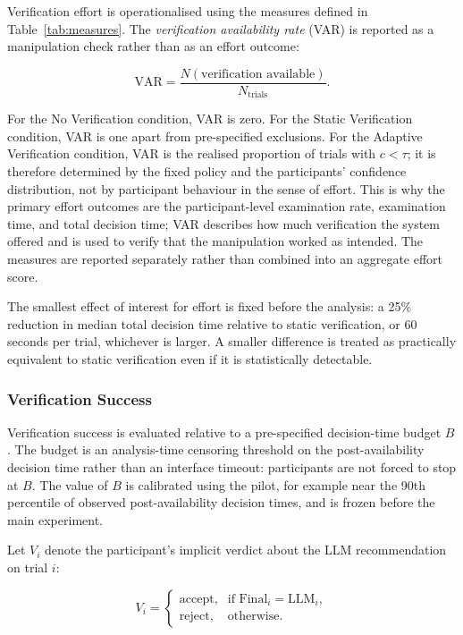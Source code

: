 \documentclass[oneside,final,14pt,a4paper]{extreport}
\begin{document}
Verification effort is operationalised using the measures defined in
Table~\ref{tab:measures}. The \emph{verification availability rate} (VAR) is
reported as a manipulation check rather than as an effort outcome:

$$
\text{VAR}
=
\frac{
N(\text{verification available})
}{
N_{\text{trials}}
}.
$$

For the No Verification condition, VAR is zero. For the Static Verification
condition, VAR is one apart from pre-specified exclusions. For the Adaptive
Verification condition, VAR is the realised proportion of trials with
$c<\tau$; it is therefore determined by the fixed policy and the participants'
confidence distribution, not by participant behaviour in the sense of effort.
This is why the primary effort outcomes are the participant-level examination
rate, examination time, and total decision time; VAR describes how much
verification the system offered and is used to verify that the manipulation
worked as intended. The measures are reported separately rather than combined
into an aggregate effort score.

The smallest effect of interest for effort is fixed before the analysis: a
25\% reduction in median total decision time relative to static verification,
or 60 seconds per trial, whichever is larger. A smaller difference is treated
as practically equivalent to static verification even if it is statistically
detectable.

\subsubsection{Verification Success}
\label{subsubsec:verification-success}

Verification success is evaluated relative to a pre-specified decision-time
budget $B$. The budget is an analysis-time censoring threshold on the
post-availability decision time rather than an interface timeout: participants
are not forced to stop at $B$. The value of $B$ is calibrated using the pilot,
for example near the 90th percentile of observed post-availability decision
times, and is frozen before the main experiment.

Let $V_i$ denote the participant's implicit verdict about the LLM
recommendation on trial $i$:

$$
V_i =
\begin{cases}
\text{accept}, & \text{if Final}_i=\text{LLM}_i,\\
\text{reject}, & \text{otherwise}.
\end{cases}
$$
\end{document}
